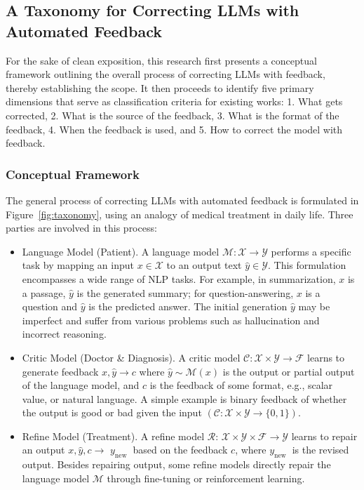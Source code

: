 \documentclass[12pt]{extarticle}
\begin{document}
\subsection{A Taxonomy for Correcting LLMs with Automated Feedback}
For the sake of clean exposition, this research first presents a conceptual framework outlining the overall process of correcting LLMs with feedback, thereby establishing the scope. It then proceeds to identify five primary dimensions that serve as classification criteria for existing works: 1. What gets corrected, 2. What is the source of the feedback, 3. What is the format of the feedback, 4. When the feedback is used, and 5. How to correct the model with feedback.

\subsubsection{Conceptual Framework}
The general process of correcting LLMs with automated feedback is formulated in Figure~\ref{fig:taxonomy}, using an analogy of medical treatment in daily life. Three parties are involved in this process:

\begin{itemize}
    \item Language Model (Patient). A language model $\mathcal{M}: \mathcal{X} \rightarrow \mathcal{Y}$ performs a specific task by mapping an input $x \in \mathcal{X}$ to an output text $\hat{y} \in \mathcal{Y}$. This formulation encompasses a wide range of NLP tasks. For example, in summarization, $x$ is a passage, $\hat{y}$ is the generated summary; for question-answering, $x$ is a question and $\hat{y}$ is the predicted answer. The initial generation $\hat{y}$ may be imperfect and suffer from various problems such as hallucination and incorrect reasoning.

    \item Critic Model (Doctor \& Diagnosis). A critic model $\mathcal{C}: \mathcal{X} \times \mathcal{Y} \rightarrow \mathcal{F}$ learns to generate feedback $x, \hat{y} \rightarrow c$ where $\hat{y} \sim \mathcal{M}(x)$ is the output or partial output of the language model, and $c$ is the feedback of some format, e.g., scalar value, or natural language. A simple example is binary feedback of whether the output is good or bad given the input $(\mathcal{C}: \mathcal{X} \times \mathcal{Y} \rightarrow\{0,1\})$.

    \item Refine Model (Treatment). A refine model $\mathcal{R}$: $\mathcal{X} \times \mathcal{Y} \times \mathcal{F} \rightarrow \mathcal{Y}$ learns to repair an output $x, \hat{y}, c \rightarrow$ $y_{\text {new }}$ based on the feedback $c$, where $y_{\text {new }}$ is the revised output. Besides repairing output, some refine models directly repair the language model $\mathcal{M}$ through fine-tuning or reinforcement learning.
\end{itemize}
\end{document}
